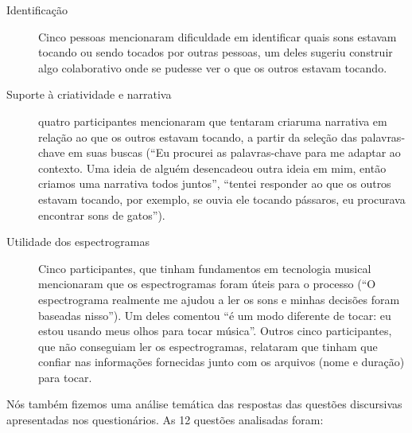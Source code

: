 \begin{description}
  \item[Identificação] Cinco pessoas mencionaram dificuldade em identificar quais sons estavam tocando ou sendo tocados por outras pessoas, um deles sugeriu construir algo colaborativo onde se pudesse ver o que os outros estavam tocando.

\item[Suporte à criatividade e narrativa] quatro participantes mencionaram que tentaram criaruma narrativa em relação ao que os outros estavam tocando, a partir da seleção das palavras-chave em suas buscas (``Eu procurei as palavras-chave para me adaptar ao contexto. Uma ideia de alguém desencadeou outra ideia em mim, então criamos uma narrativa todos juntos'', ``tentei responder ao que os outros estavam tocando, por exemplo, se ouvia ele tocando pássaros, eu procurava encontrar sons de gatos'').

\item[Utilidade dos espectrogramas] Cinco participantes, que tinham fundamentos em tecnologia musical mencionaram que os espectrogramas foram úteis para o processo (``O espectrograma realmente me ajudou a ler os sons e minhas decisões foram baseadas nisso''). Um deles comentou ``é um modo diferente de tocar: eu estou usando meus olhos para tocar música''. Outros cinco participantes, que não conseguiam ler os espectrogramas, relataram que tinham que confiar nas informações fornecidas junto com os arquivos (nome e duração) para tocar.

\end{description}

Nós também fizemos uma análise temática das respostas das questões discursivas apresentadas nos questionários. As 12 questões analisadas foram: 

